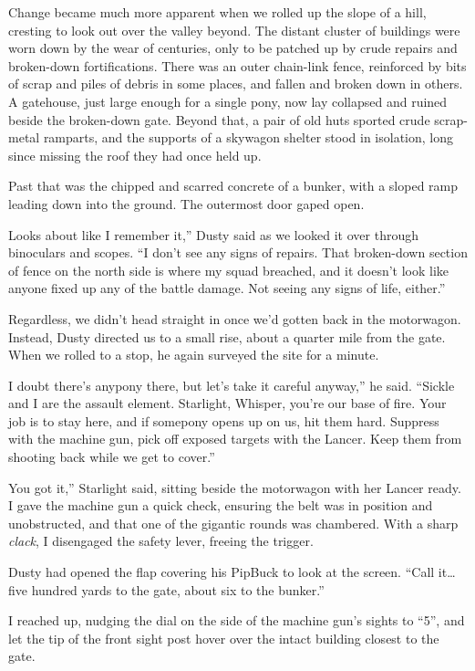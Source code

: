 Change became much more apparent when we rolled up the slope of a hill, cresting to look out over the valley beyond. The distant cluster of buildings were worn down by the wear of centuries, only to be patched up by crude repairs and broken-down fortifications. There was an outer chain-link fence, reinforced by bits of scrap and piles of debris in some places, and fallen and broken down in others. A gatehouse, just large enough for a single pony, now lay collapsed and ruined beside the broken-down gate. Beyond that, a pair of old huts sported crude scrap-metal ramparts, and the supports of a skywagon shelter stood in isolation, long since missing the roof they had once held up.

Past that was the chipped and scarred concrete of a bunker, with a sloped ramp leading down into the ground. The outermost door gaped open.

\leavevmode{}Looks about like I remember it,” Dusty said as we looked it over through binoculars and scopes. “I don’t see any signs of repairs. That broken-down section of fence on the north side is where my squad breached, and it doesn’t look like anyone fixed up any of the battle damage. Not seeing any signs of life, either.”

Regardless, we didn’t head straight in once we’d gotten back in the motorwagon. Instead, Dusty directed us to a small rise, about a quarter mile from the gate. When we rolled to a stop, he again surveyed the site for a minute.

\leavevmode{}I doubt there’s anypony there, but let’s take it careful anyway,” he said. “Sickle and I are the assault element. Starlight, Whisper, you’re our base of fire. Your job is to stay here, and if somepony opens up on us, hit them hard. Suppress with the machine gun, pick off exposed targets with the Lancer. Keep them from shooting back while we get to cover.”

\leavevmode{}You got it,” Starlight said, sitting beside the motorwagon with her Lancer ready. I gave the machine gun a quick check, ensuring the belt was in position and unobstructed, and that one of the gigantic rounds was chambered. With a sharp \textit{clack}, I disengaged the safety lever, freeing the trigger.

Dusty had opened the flap covering his PipBuck to look at the screen. “Call it… five hundred yards to the gate, about six to the bunker.”

I reached up, nudging the dial on the side of the machine gun’s sights to “5”, and let the tip of the front sight post hover over the intact building closest to the gate.

